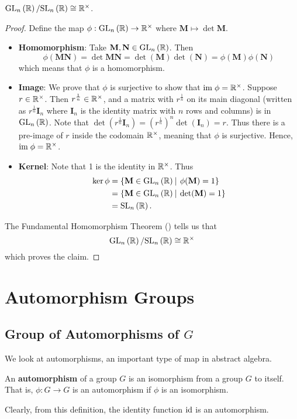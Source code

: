 \begin{proposition}
    $\mathrm{GL}_{n}\left(\mathbb{R}\right) / \mathrm{SL}_{n}\left(\mathbb{R}\right) \cong \mathbb{R}^\times$.
\end{proposition}
\begin{proof}
    Define the map $\phi: \mathrm{GL}_{n}\left(\mathbb{R}\right) \to \mathbb{R}^\times$ where $\textbf{M} \mapsto \det\textbf{M}$.
	\begin{itemize}
	    \item \textbf{Homomorphism}: Take $\textbf{M}, \textbf{N} \in \mathrm{GL}_{n}\left(\mathbb{R}\right)$. Then
	    \[
	        \phi(\textbf{MN}) = \det \textbf{MN} = \det(\textbf{M})\det(\textbf{N}) = \phi(\textbf{M})\phi(\textbf{N})
	    \]
	    which means that $\phi$ is a homomorphism.

	    \item \textbf{Image}: We prove that $\phi$ is surjective to show that $\mathrm{im}\; \phi = \mathbb{R}^\times$. Suppose $r \in \mathbb{R}^\times$. Then $r^{\frac1n} \in \mathbb{R}^\times$, and a matrix with $r^{\frac1n}$ on its main diagonal (written as $r^{\frac1n}\textbf{I}_n$ where $\textbf{I}_n$ is the identity matrix with $n$ rows and columns) is in $\mathrm{GL}_{n}\left(\mathbb{R}\right)$. Note that $\det\left(r^{\frac1n}\textbf{I}_n\right) = \left(r^{\frac1n}\right)^n\det(\textbf{I}_n) = r$. Thus there is a pre-image of $r$ inside the codomain $\mathbb{R}^\times$, meaning that $\phi$ is surjective. Hence, $\mathrm{im}\; \phi = \mathbb{R}^\times$.

	    \item \textbf{Kernel}: Note that 1 is the identity in $\mathbb{R}^\times$. Thus
	    \begin{align*}
	        \ker\phi &= \{\textbf{M} \in \GL{n}{\R} \vert \phi(\textbf{M}) = 1\} \\
	        &= \{\textbf{M} \in \GL{n}{\R} \vert \det(\textbf{M}) = 1\}\\
	        &= \SL{n}{\R}.
	    \end{align*}
	\end{itemize}
	The Fundamental Homomorphism Theorem () tells us that
	\[
	    \mathrm{GL}_{n}\left(\mathbb{R}\right) / \mathrm{SL}_{n}\left(\mathbb{R}\right) \cong \mathbb{R}^\times
	\]
	which proves the claim.
\end{proof}

\section{Automorphism Groups}
\subsection{Group of Automorphisms of \texorpdfstring{$G$}{G}}
We look at automorphisms, an important type of map in abstract algebra.
\begin{definition}
    An \textbf{automorphism} of a group $G$ is an isomorphism from a group $G$ to itself. That is, $\phi: G \to G$ is an automorphism if $\phi$ is an isomorphism.
\end{definition}
Clearly, from this definition, the identity function $\mathrm{id}$ is an automorphism.

